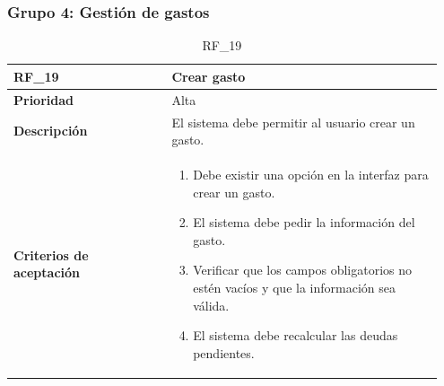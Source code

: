 \clearpage

\subsubsection{Grupo 4: Gestión de gastos}
\label{subsubsec:grupo4}

\begin{table}[htb!]
    \begin{tabular}{|p{0.35\linewidth}|p{0.6\linewidth}|}
        \hline
        \rowcolor[HTML]{C0C0C0}  
        \textbf{RF\_19} & \textbf{Crear gasto} \\
        \hline
        \textbf{Prioridad} & Alta \\
        \hline
        \textbf{Descripción} & El sistema debe permitir al usuario crear un gasto.  \\
        \hline
        \vspace{0.5mm}
        \textbf{Criterios de aceptación} & 
        \begin{minipage}[t]{0.9\linewidth}
            \begin{enumerate}
                \item Debe existir una opción en la interfaz para crear un gasto.
                \item El sistema debe pedir la información del gasto.
                \item Verificar que los campos obligatorios no estén vacíos y que la información sea válida.
                \item El sistema debe recalcular las deudas pendientes.
            \end{enumerate}
            \vspace{2mm}
        \end{minipage} \\
        \hline
    \end{tabular}
    \caption{RF\_19}
    \label{req:RF19}
\end{table}


